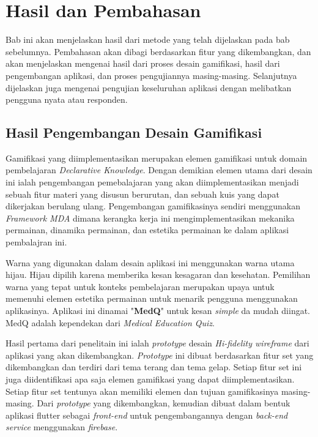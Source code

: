 \chapter{Hasil dan Pembahasan}
Bab ini akan menjelaskan hasil dari metode yang telah dijelaskan pada bab sebelumnya. 
Pembahasan akan dibagi berdasarkan fitur yang dikembangkan, dan akan menjelaskan mengenai hasil dari proses desain gamifikasi, hasil dari pengembangan aplikasi, dan proses pengujiannya masing-masing.
Selanjutnya dijelaskan juga mengenai pengujian keseluruhan aplikasi dengan melibatkan pengguna nyata atau responden.

\section{Hasil Pengembangan Desain Gamifikasi}
Gamifikasi yang diimplementasikan merupakan elemen gamifikasi untuk domain pembelajaran \textit{Declarative Knowledge}.
Dengan demikian elemen utama dari desain ini ialah pengembangan pemebalajaran yang akan diimplementasikan menjadi sebuah fitur materi yang disusun berurutan, dan sebuah kuis yang dapat dikerjakan berulang ulang.
Pengembangan gamifikasinya sendiri menggunakan \textit{Framework MDA} dimana kerangka kerja ini mengimplementasikan mekanika permainan, dinamika permainan, dan estetika permainan ke dalam aplikasi pembalajran ini.

Warna yang digunakan dalam desain aplikasi ini menggunakan warna utama hijau.
Hijau dipilih karena memberika kesan kesagaran dan kesehatan.
Pemilihan warna yang tepat untuk konteks pembelajaran merupakan upaya untuk memenuhi elemen estetika permainan untuk menarik pengguna menggunakan aplikasinya.  
Aplikasi ini dinamai "\textbf{MedQ}" untuk kesan \textit{simple} da mudah diingat. MedQ adalah kependekan dari \textit{Medical Education Quiz}.

Hasil pertama dari penelitain ini ialah \textit{prototype} desain \textit{Hi-fidelity wireframe} dari aplikasi yang akan dikembangkan.
\textit{Prototype} ini dibuat berdasarkan fitur set yang dikembangkan dan terdiri dari tema terang dan tema gelap. Setiap fitur set ini juga diidentifikasi apa saja elemen gamifikasi yang dapat diimplementasikan.
Setiap fitur set tentunya akan memiliki elemen dan tujuan gamifikasinya masing-masing. Dari \textit{prototype} yang dikembangkan, kemudian dibuat dalam bentuk aplikasi flutter sebagai \textit{front-end} untuk pengembangannya dengan \textit{back-end service} menggunakan \textit{firebase}.

\newpage
